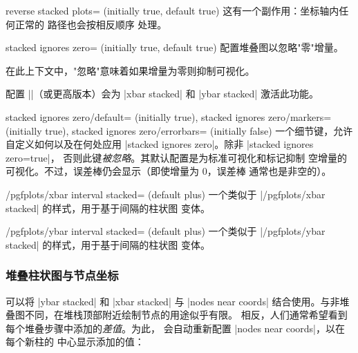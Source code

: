 {\begin{pgfplotskey}{reverse stacked plots= (initially true, default true)}
    这有一个副作用：坐标轴内任何正常的 \Tikz{} 路径也会按相反顺序
    处理。
\end{pgfplotskey}

\begin{pgfplotskey}{stacked ignores zero= (initially true, default true)}
    配置堆叠图以忽略"零"增量。

    在此上下文中，"忽略"意味着如果增量为零则抑制可视化。

    配置 |\pgfplotsset{compat=1.9}|（或更高版本）会为 |xbar stacked|
    和 |ybar stacked| 激活此功能。

    \begin{pgfplotskeylist}{%
        stacked ignores zero/default= (initially true),
        stacked ignores zero/markers= (initially true),
        stacked ignores zero/errorbars= (initially false)%
    }
        一个细节键，允许自定义如何以及在何处应用
        |stacked ignores zero|。除非
        |stacked ignores zero=true|，
        否则此键\emph{被忽略}。其默认配置是为标准可视化和标记抑制
        空增量的可视化。不过，误差棒仍会显示（即使增量为 $0$，误差棒
        通常也是非空的）。
    \end{pgfplotskeylist}
\end{pgfplotskey}

\begin{stylekey}{/pgfplots/xbar interval stacked= (default plus)}
    一个类似于 |/pgfplots/xbar stacked| 的样式，用于基于间隔的柱状图
    变体。
\end{stylekey}

\begin{stylekey}{/pgfplots/ybar interval stacked= (default plus)}
    一个类似于 |/pgfplots/ybar stacked| 的样式，用于基于间隔的柱状图
    变体。
\end{stylekey}


\subsubsection{堆叠柱状图与节点坐标}

可以将 |ybar stacked| 和 |xbar stacked| 与 |nodes near coords|
结合使用。与非堆叠图不同，在堆栈顶部附近绘制节点的用途似乎有限。
相反，人们通常希望看到每个堆叠步骤中添加的\emph{差值}。为此，
\PGFPlots{} 会自动重新配置 |nodes near coords|，以在每个新柱的
中心显示添加的值：

\begin{codeexample}[]
\end{codeexample}

}
